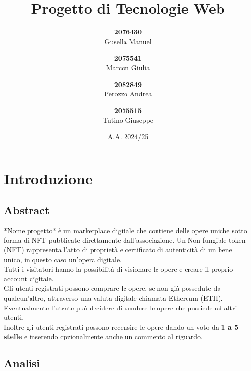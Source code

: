 \documentclass[10pt]{article}
\title{Progetto di Tecnologie Web}
\author{
    \textbf{2076430}\\ Gusella Manuel \and
    \textbf{2075541}\\ Marcon Giulia \and
    \textbf{2082849}\\ Perozzo Andrea \and
    \textbf{2075515}\\ Tutino Giuseppe
}
\date{A.A. 2024/25}
\begin{document}
\maketitle
\tableofcontents
\newpage

\section{Introduzione}
\subsection{Abstract}
*Nome progetto* è un marketplace digitale che contiene delle opere uniche sotto forma di NFT pubblicate direttamente dall'associazione.
Un Non-fungible token (NFT) rappresenta l'atto di proprietà e certificato di autenticità di un bene unico, in questo caso un'opera digitale. \\
Tutti i visitatori hanno la possibilità di visionare le opere e creare il proprio account digitale.\\
Gli utenti registrati possono comprare le opere, se non già possedute da qualcun'altro, attraverso una valuta digitale chiamata Ethereum (ETH). Eventualmente l'utente può decidere di vendere le opere che possiede ad altri utenti.\\
Inoltre gli utenti registrati possono recensire le opere dando un voto da \textbf{1 a 5 stelle} e inserendo opzionalmente anche un commento al riguardo.\\


\subsection{Analisi}
\end{document}
